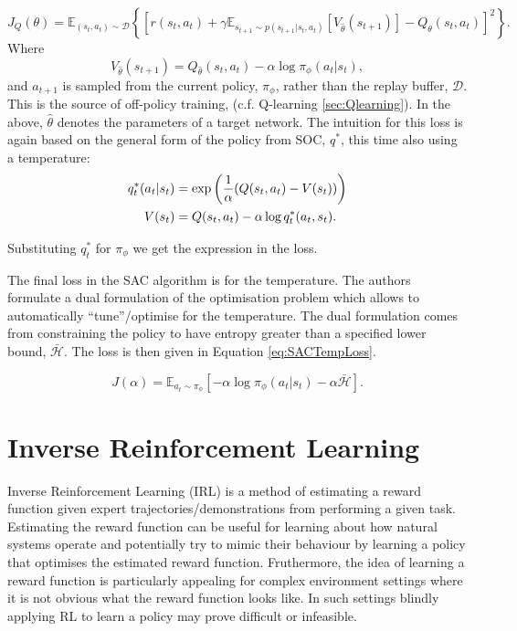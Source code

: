 \documentclass{report}
\numberwithin{equation}{section}
\numberwithin{figure}{section}
\numberwithin{table}{section}
\numberwithin{algorithm}{section}
\begin{document}
\begin{equation}\label{eq:SACQfuncLoss}
  J_Q(\theta)=\mathbb{E}_{(s_t,a_t)\sim \mathcal{D}}\left\{\left[
    r(s_t, a_t) 
    + \gamma \mathbb{E}_{s_{t+1}\sim p(s_{t+1}|s_t, a_t)}[V_{\hat{\theta}}(s_{t+1})]
    - Q_\theta(s_t,a_t)
  \right]^2\right\}.
\end{equation}
Where 
\begin{equation*}
  V_{\hat{\theta}}(s_{t+1})=Q_{\hat{\theta}}(s_t,a_t) - \alpha \log \pi_\phi(a_t|s_t),
\end{equation*}
and $a_{t+1}$ is sampled from the current policy, $\pi_\phi$, rather 
than the replay buffer, $\mathcal{D}$. This is the source of off-policy 
training, (c.f. Q-learning \ref{sec:Qlearning}). In the above, 
$\hat{\theta}$ denotes the parameters of a target 
network. The intuition for this loss is again based on the 
general form of the policy from SOC, $q^*$, this time also using 
a temperature:
\begin{align}
  q_t^*(a_t|s_t)&=\exp\left(
    \frac{1}{\alpha}(Q(s_t,a_t) - V(s_t))
  \right)\notag\\
  V(s_t)&=Q(s_t,a_t) - \alpha \log q_t^*(a_t,s_t).
\end{align}

Substituting $q^*_t$ for $\pi_\phi$ we get the expression in the 
loss.

The final loss in the SAC algorithm is for the temperature. 
The authors formulate a dual formulation of the optimisation 
problem which allows to automatically ``tune''/optimise for 
the temperature. The dual formulation comes from constraining 
the policy to have entropy greater than a specified lower 
bound, $\bar{\mathcal{H}}$.
The loss is then given in Equation \ref{eq:SACTempLoss}.

\begin{equation}\label{eq:SACTempLoss}
  J(\alpha)=\mathbb{E}_{a_t\sim \pi_\phi}[-\alpha \log \pi_\phi(a_t|s_t) - \alpha \bar{\mathcal{H}}].
\end{equation}


\section{Inverse Reinforcement Learning}\label{sec:IRL}
Inverse Reinforcement Learning (IRL) is a method of estimating 
a reward function given expert trajectories/demonstrations 
from performing a given task. Estimating the reward function can be 
useful for learning about how natural systems operate and potentially 
try to mimic their behaviour by learning a policy that 
optimises the 
estimated reward function. Fruthermore, the idea of learning a 
reward function 
is particularly appealing for complex environment settings 
where it is not obvious what the reward function looks like. 
In such settings blindly applying RL to learn a policy may 
prove difficult or infeasible. 
\end{document}
